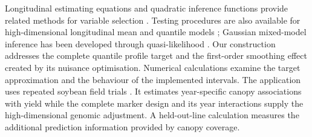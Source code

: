 Longitudinal estimating equations and quadratic inference functions
provide related methods for variable selection
\cite{zu2023,song2024,bhattacharya2026}. Testing procedures are also
available for high-dimensional longitudinal mean and quantile models
\cite{fang2020,wang2023}; Gaussian mixed-model inference has been
developed through quasi-likelihood \cite{li2022}. Our construction
addresses the complete quantile profile target and the first-order
smoothing effect created by its nuisance optimisation. Numerical
calculations examine the target approximation and the behaviour of the
implemented intervals. The application uses repeated soybean field
trials \cite{xavier2017canopy}. It estimates year-specific canopy
associations with yield while the complete marker design and its year
interactions supply the high-dimensional genomic adjustment. A
held-out-line calculation measures the additional prediction information
provided by canopy coverage.
